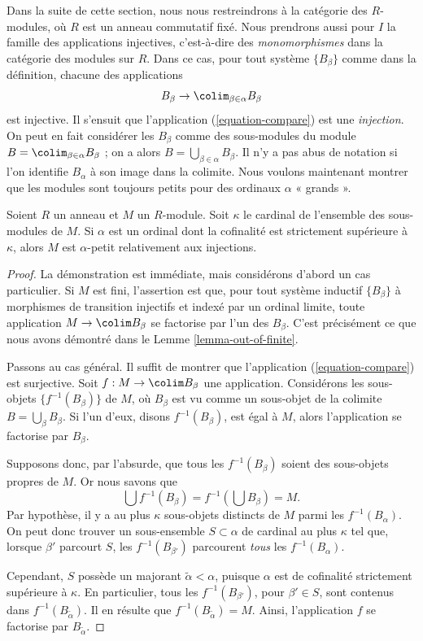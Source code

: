 \noindent
Dans la suite de cette section, nous nous restreindrons à la catégorie des
$R$-modules, où $R$ est un anneau commutatif fixé. Nous prendrons aussi pour
$I$ la famille des applications injectives, c'est-à-dire des
{\it monomorphismes} dans la catégorie des modules sur $R$. Dans ce cas, pour
tout système $\{B_\beta\}$ comme dans la définition, chacune des applications
$$
B_\beta \to \colim_{\beta \in \alpha} B_\beta
$$
est injective. Il s'ensuit que l'application (\ref{equation-compare}) est une
{\it injection}. On peut en fait considérer les $B_\beta$ comme des
sous-modules du module $B = \colim_{\beta \in \alpha} B_\beta$ ; on a alors
$B = \bigcup_{\beta \in \alpha} B_\beta$. Il n'y a pas abus de notation si
l'on identifie $B_\alpha$ à son image dans la colimite. Nous voulons maintenant
montrer que les modules sont toujours petits pour des ordinaux $\alpha$
« grands ».

\begin{proposition}
\label{proposition-modules-are-small}
Soient $R$ un anneau et $M$ un $R$-module. Soit $\kappa$ le cardinal de
l'ensemble des sous-modules de $M$. Si $\alpha$ est un ordinal dont la
cofinalité est strictement supérieure à $\kappa$, alors $M$ est
$\alpha$-petit relativement aux injections.
\end{proposition}

\begin{proof}
La démonstration est immédiate, mais considérons d'abord un cas particulier.
Si $M$ est fini, l'assertion est que, pour tout système inductif
$\{B_\beta\}$ à morphismes de transition injectifs et indexé par un ordinal
limite, toute application $M \to \colim B_\beta$ se factorise par l'un des
$B_\beta$. C'est précisément ce que nous avons démontré dans le
Lemme \ref{lemma-out-of-finite}.

\medskip\noindent
Passons au cas général. Il suffit de montrer que l'application
(\ref{equation-compare}) est surjective. Soit
$f : M \to \colim B_\beta$ une application. Considérons les sous-objets
$\{f^{-1}(B_\beta)\}$ de $M$, où $B_\beta$ est vu comme un sous-objet de la
colimite $B = \bigcup_\beta B_\beta$. Si l'un d'eux, disons
$f^{-1}(B_\beta)$, est égal à $M$, alors l'application se factorise par
$B_\beta$.

\medskip\noindent
Supposons donc, par l'absurde, que tous les $f^{-1}(B_\beta)$ soient des
sous-objets propres de $M$. Or nous savons que
$$
\bigcup f^{-1}(B_\beta) = f^{-1}\left(\bigcup B_\beta\right) = M.
$$
Par hypothèse, il y a au plus $\kappa$ sous-objets distincts de $M$ parmi les
$f^{-1}(B_\alpha)$. On peut donc trouver un sous-ensemble $S \subset \alpha$
de cardinal au plus $\kappa$ tel que, lorsque $\beta'$ parcourt $S$, les
$f^{-1}(B_{\beta'})$ parcourent \emph{tous} les $f^{-1}(B_\alpha)$.

\medskip\noindent
Cependant, $S$ possède un majorant $\widetilde{\alpha} < \alpha$, puisque
$\alpha$ est de cofinalité strictement supérieure à $\kappa$. En particulier,
tous les $f^{-1}(B_{\beta'})$, pour $\beta' \in S$, sont contenus dans
$f^{-1}(B_{\widetilde{\alpha}})$. Il en résulte que
$f^{-1}(B_{\widetilde{\alpha}}) = M$. Ainsi, l'application $f$ se factorise
par $B_{\widetilde{\alpha}}$.
\end{proof}

